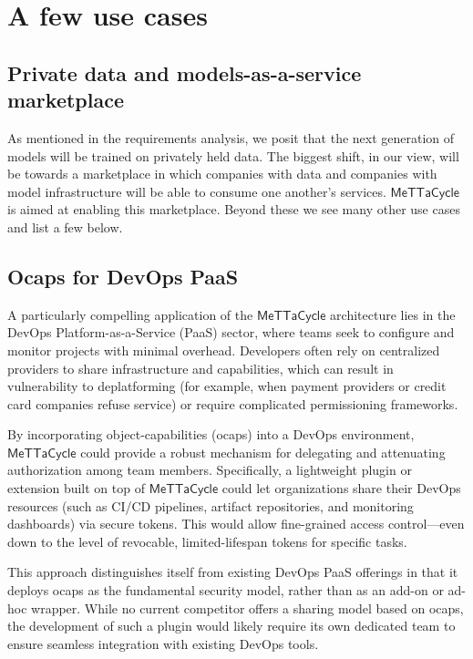 \documentclass{article}
\newcommand{\MC}{\mathsf{MeTTaCycle}}
\begin{document}
\section{A few use cases}

\subsection{Private data and models-as-a-service marketplace}

As mentioned in the requirements analysis, we posit that the next
generation of models will be trained on privately held data. The
biggest shift, in our view, will be towards a marketplace in which
companies with data and companies with model infrastructure will be
able to consume one another's services. $\MC$ is aimed at enabling
this marketplace. Beyond these we see many other use cases and list a
few below.

\subsection{Ocaps for DevOps PaaS}

A particularly compelling application of the $\MC$ architecture lies
in the DevOps Platform-as-a-Service (PaaS) sector, where teams seek to
configure and monitor projects with minimal overhead. Developers often
rely on centralized providers to share infrastructure and
capabilities, which can result in vulnerability to deplatforming (for
example, when payment providers or credit card companies refuse
service) or require complicated permissioning frameworks.

By incorporating object-capabilities (ocaps) into a DevOps
environment, $\MC$ could provide a robust mechanism for delegating and
attenuating authorization among team members. Specifically, a
lightweight plugin or extension built on top of $\MC$ could let
organizations share their DevOps resources (such as CI/CD pipelines,
artifact repositories, and monitoring dashboards) via secure
tokens. This would allow fine-grained access control---even down to
the level of revocable, limited-lifespan tokens for specific tasks.

This approach distinguishes itself from existing DevOps PaaS offerings
in that it deploys ocaps as the fundamental security model, rather
than as an add-on or ad-hoc wrapper. While no current competitor
offers a sharing model based on ocaps, the development of such a
plugin would likely require its own dedicated team to ensure seamless
integration with existing DevOps tools.
\end{document}

